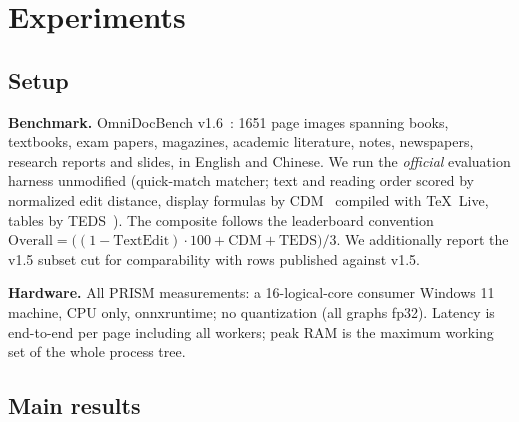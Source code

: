 \section{Experiments}
\label{sec:experiments}

\subsection{Setup}
\textbf{Benchmark.} OmniDocBench v1.6~\cite{omnidocbench}: 1651 page images spanning books, textbooks, exam papers, magazines, academic literature, notes, newspapers, research reports and slides, in English and Chinese. We run the \emph{official} evaluation harness unmodified (quick-match matcher; text and reading order scored by normalized edit distance, display formulas by CDM~\cite{cdm} compiled with TeX~Live, tables by TEDS~\cite{teds}). The composite follows the leaderboard convention $\mathrm{Overall}=\big((1-\mathrm{TextEdit})\cdot 100+\mathrm{CDM}+\mathrm{TEDS}\big)/3$. We additionally report the v1.5 subset cut for comparability with rows published against v1.5.

\textbf{Hardware.} All PRISM measurements: a 16-logical-core consumer Windows 11 machine, CPU only, onnxruntime; no quantization (all graphs fp32). Latency is end-to-end per page including all workers; peak RAM is the maximum working set of the whole process tree.

\subsection{Main results}
\label{sec:main_results}

